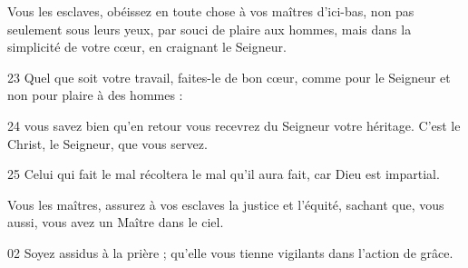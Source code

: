  Vous les esclaves, obéissez en toute chose à vos maîtres d’ici-bas, non pas seulement sous leurs yeux, par souci de plaire aux hommes, mais dans la simplicité de votre cœur, en craignant le Seigneur. 

23 Quel que soit votre travail, faites-le de bon cœur, comme pour le Seigneur et non pour plaire à des hommes :

24 vous savez bien qu’en retour vous recevrez du Seigneur votre héritage. C’est le Christ, le Seigneur, que vous servez.

25 Celui qui fait le mal récoltera le mal qu’il aura fait, car Dieu est impartial.

Vous les maîtres, assurez à vos esclaves la justice et l’équité, sachant que, vous aussi, vous avez un Maître dans le ciel.

02 Soyez assidus à la prière ; qu’elle vous tienne vigilants dans l’action de grâce.